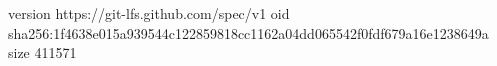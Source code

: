 version https://git-lfs.github.com/spec/v1
oid sha256:1f4638e015a939544c122859818cc1162a04dd065542f0fdf679a16e1238649a
size 411571
